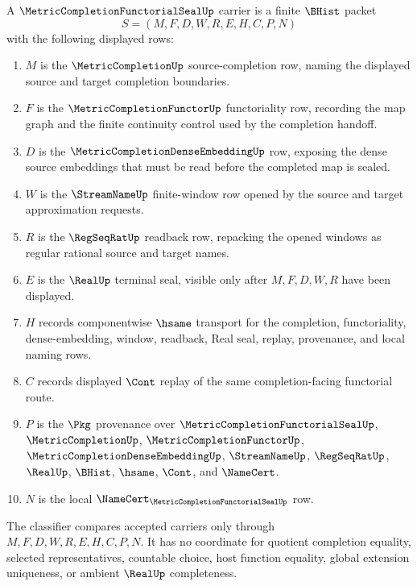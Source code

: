 \begin{definition}
\label{def:metric-completion-functorial-seal-carrier}
A $\MetricCompletionFunctorialSealUp$ carrier is a finite $\BHist$ packet
$$
S=(M,F,D,W,R,E,H,C,P,N)
$$
with the following displayed rows:
\begin{enumerate}
\item $M$ is the $\MetricCompletionUp$ source-completion row, naming the displayed source and target completion boundaries.
\item $F$ is the $\MetricCompletionFunctorUp$ functoriality row, recording the map graph and the finite continuity control used by the completion handoff.
\item $D$ is the $\MetricCompletionDenseEmbeddingUp$ row, exposing the dense source embeddings that must be read before the completed map is sealed.
\item $W$ is the $\StreamNameUp$ finite-window row opened by the source and target approximation requests.
\item $R$ is the $\RegSeqRatUp$ readback row, repacking the opened windows as regular rational source and target names.
\item $E$ is the $\RealUp$ terminal seal, visible only after $M,F,D,W,R$ have been displayed.
\item $H$ records componentwise $\hsame$ transport for the completion, functoriality, dense-embedding, window, readback, Real seal, replay, provenance, and local naming rows.
\item $C$ records displayed $\Cont$ replay of the same completion-facing functorial route.
\item $P$ is the $\Pkg$ provenance over $\MetricCompletionFunctorialSealUp$, $\MetricCompletionUp$, $\MetricCompletionFunctorUp$, $\MetricCompletionDenseEmbeddingUp$, $\StreamNameUp$, $\RegSeqRatUp$, $\RealUp$, $\BHist$, $\hsame$, $\Cont$, and $\NameCert$.
\item $N$ is the local $\NameCert_{\MetricCompletionFunctorialSealUp}$ row.
\end{enumerate}
The classifier compares accepted carriers only through $M,F,D,W,R,E,H,C,P,N$. It has no coordinate for quotient completion equality, selected representatives, countable choice, host function equality, global extension uniqueness, or ambient $\RealUp$ completeness.
\end{definition}

